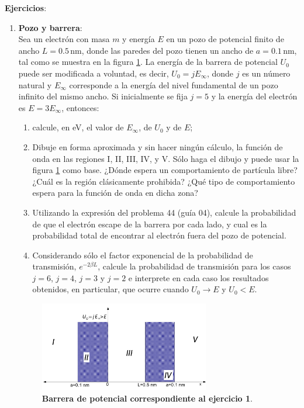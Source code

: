 \documentclass[a4paper,12pt]{article}
\begin{document}
{\bf{Ejercicios}}:
\begin{enumerate}
	\item {\bf{Pozo y barrera}}:\\
		Sea un electrón con masa $m$ y energía $E$ en un pozo de potencial
		finito de ancho $L=0.5$\,nm, donde las paredes del pozo tienen un ancho
		de $a=0.1$\,nm, tal como se muestra en la figura \ref{fig1}. La energía
		de la barrera de potencial $U_0$ puede ser modificada a voluntad, es
		decir, $U_0 = j E_\infty$, donde $j$ es un número natural y $E_\infty$
		corresponde a la energía del nivel fundamental de un pozo infinito del
		mismo ancho. Si inicialmente se fija $j=5$ y la energía del electrón es
		$E=3 E_\infty$, entonces:
		\begin{enumerate}
			\item calcule, en eV, el valor de $E_\infty$, de $U_0$ y de $E$;
			\item Dibuje en forma aproximada y sin hacer ningún cálculo, la
				función de onda en las regiones I, II, III, IV, y V. Sólo haga
				el dibujo y puede usar la figura \ref{fig1} como base. ¿Dónde
				espera un comportamiento de partícula libre? ¿Cuál es la región
				clásicamente prohibida? ¿Qué tipo de comportamiento espera para
				la función de onda en dicha zona?
			\item Utilizando la expresión del problema 44 (guía 04), calcule la
				probabilidad de que el electrón escape de la barrera por cada
				lado, y cual es la probabilidad total de encontrar al electrón
				fuera del pozo de potencial.
			\item Considerando sólo el factor exponencial de la probabilidad de
				transmisión, $e^{-2\beta L}$, calcule la probabilidad de
				transmisión para los casos $j=6$, $j=4$, $j=3$ y $j=2$ e
				interprete en cada caso los resultados obtenidos, en
				particular, que ocurre cuando $U_0 \to E$ y $U_0<E$.
		\end{enumerate}
		\begin{figure}\label{fig1}
			\begin{center}
			\includegraphics[width=0.7\textwidth]{../materiales/barrera.png}
			\end{center}
			\caption{{\bf{Barrera de potencial correspondiente al ejercicio 1}}.}
		\end{figure}


\end{enumerate}
\end{document}
